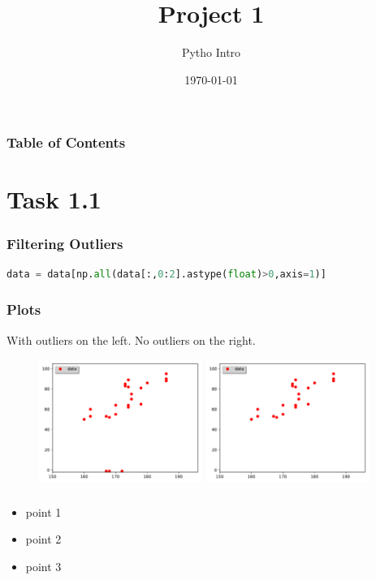\documentclass{beamer}
\title[Project 1]{Project 1}
\subtitle{Pytho Intro}
\author{}
\institute[Universität Bonn]{Rheinische Friedrich-Wilhelms-Universität}
\date{\today}
\begin{document}
	
\begin{frame}%
	\titlepage
\end{frame}

\begin{frame}%
\frametitle{Table of Contents}
\tableofcontents%
\end{frame}


\section{Task 1.1}

\begin{frame}[fragile]
\frametitle{Filtering Outliers}

\begin{lstlisting}[language=Python]
	data = data[np.all(data[:,0:2].astype(float)>0,axis=1)]
\end{lstlisting}
\end{frame}

\begin{frame}
\frametitle{Plots}
With outliers on the left. No outliers on the right.
\begin{figure}
\includegraphics[width=0.475\textwidth]{graphics/plotHW}
\hfill
\includegraphics[width=0.475\textwidth]{graphics/plotHW_no_outlier}
\end{figure}
\end{frame}


\begin{frame}
\frametitle{}
\begin{itemize}
\item<1-> point 1
\item<1-> point 2
\item<1-> point 3
\end{itemize}
\end{frame}
\end{document}
